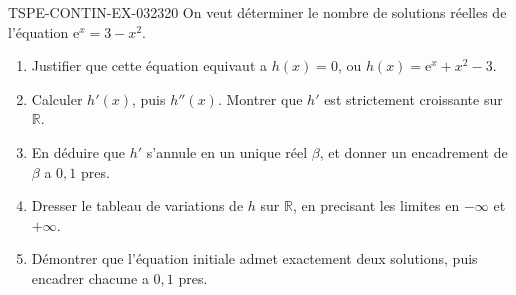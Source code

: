 \begin{exercice}{TSPE-CONTIN-EX-032}{3}{20}
On veut déterminer le nombre de solutions réelles de l'équation $\mathrm{e}^{x} = 3 - x^2$.

\begin{enumerate}
  \item Justifier que cette équation equivaut a $h(x) = 0$, ou $h(x) = \mathrm{e}^{x} + x^2 - 3$.
  \item Calculer $h'(x)$, puis $h''(x)$. Montrer que $h'$ est strictement croissante sur $\mathbb{R}$.
  \item En déduire que $h'$ s'annule en un unique réel $\beta$, et donner un encadrement de $\beta$ a $0{,}1$ pres.
  \item Dresser le tableau de variations de $h$ sur $\mathbb{R}$, en precisant les limites en $-\infty$ et $+\infty$.
  \item Démontrer que l'équation initiale admet exactement deux solutions, puis encadrer chacune a $0{,}1$ pres.
\end{enumerate}
\end{exercice}
